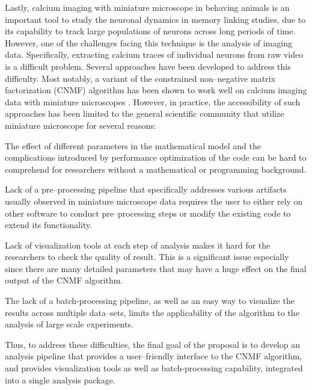 \documentclass[master.tex]{subfiles}
\begin{document}
Lastly, calcium imaging with miniature microscope in behaving animals is an
important tool to study the neuronal dynamics in memory linking studies, due to
its capability to track large populations of neurons across long periods of time.
However, one of the challenges facing this technique is the analysis of imaging
data. Specifically, extracting calcium traces of individual neurons from raw
video is a difficult problem. Several approaches have been developed to address
this difficulty. Most notably, a variant of the constrained non--negative matrix
factorization (CNMF) algorithm has been shown to work well on calcium imaging
data with miniature microscopes \cite{pnevmatikakis_simultaneous_2016,
  zhou_efficient_2016}. However, in practice, the accessibility of such
approaches has been limited to the general scientific community that utilize
miniature microscope for several reasons:
\begin{inparaenum}[a)]
\item The effect of different parameters in the mathematical model and the
  complications introduced by performance optimization of the code can be hard
  to comprehend for researchers without a mathematical or programming background.
\item Lack of a pre--processing pipeline that specifically addresses various
  artifacts usually observed in miniature microscope data requires the user to either
  rely on other software to conduct pre--processing steps or modify the existing
  code to extend its functionality.
\item Lack of visualization tools at each step of analysis makes it hard for the
  researchers to check the quality of result. This is a
  significant issue especially since there are many detailed parameters that may
  have a huge effect on the final output of the CNMF algorithm.
\item The lack of a batch-processing pipeline, as well as an easy way to visualize
  the results across multiple data--sets, limits the applicability of the
  algorithm to the analysis of large scale experiments.
\end{inparaenum}
Thus, to address these difficulties, the final goal of the proposal is to
develop an analysis pipeline that provides a user--friendly interface to the
CNMF algorithm, and provides visualization tools as well as batch-processing
capability, integrated into a single analysis package.
\end{document}
